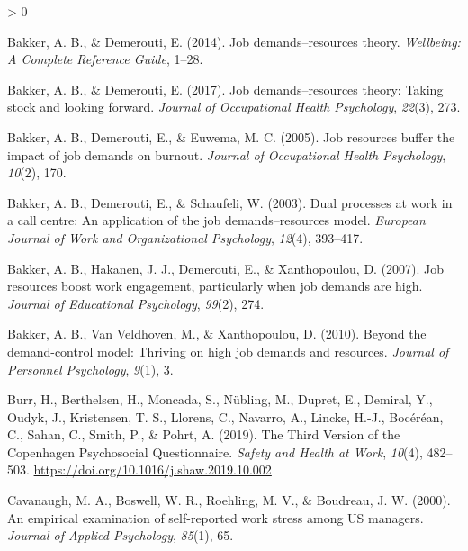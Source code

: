 \documentclass[
  english,
  man]{apa6}
\newlength{\cslhangindent}
\newenvironment{CSLReferences}[2] %
 {%
  \setlength{\parindent}{0pt}
  \ifodd #1 \everypar{\setlength{\hangindent}{\cslhangindent}}\ignorespaces\fi
  \ifnum #2 > 0
  \setlength{\parskip}{#2\baselineskip}
  \fi
 }%
 {}
\begin{document}
\begingroup
\setlength{\parindent}{-0.5in}
\setlength{\leftskip}{0.5in}

\hypertarget{refs}{}
\begin{CSLReferences}{1}{0}
\leavevmode\hypertarget{ref-bakker2014job}{}%
Bakker, A. B., \& Demerouti, E. (2014). Job demands--resources theory. \emph{Wellbeing: A Complete Reference Guide}, 1--28.

\leavevmode\hypertarget{ref-bakker2017job}{}%
Bakker, A. B., \& Demerouti, E. (2017). Job demands--resources theory: Taking stock and looking forward. \emph{Journal of Occupational Health Psychology}, \emph{22}(3), 273.

\leavevmode\hypertarget{ref-bakker2005job}{}%
Bakker, A. B., Demerouti, E., \& Euwema, M. C. (2005). Job resources buffer the impact of job demands on burnout. \emph{Journal of Occupational Health Psychology}, \emph{10}(2), 170.

\leavevmode\hypertarget{ref-bakker2003dual}{}%
Bakker, A. B., Demerouti, E., \& Schaufeli, W. (2003). Dual processes at work in a call centre: An application of the job demands--resources model. \emph{European Journal of Work and Organizational Psychology}, \emph{12}(4), 393--417.

\leavevmode\hypertarget{ref-bakker2007job}{}%
Bakker, A. B., Hakanen, J. J., Demerouti, E., \& Xanthopoulou, D. (2007). Job resources boost work engagement, particularly when job demands are high. \emph{Journal of Educational Psychology}, \emph{99}(2), 274.

\leavevmode\hypertarget{ref-bakker2010beyond}{}%
Bakker, A. B., Van Veldhoven, M., \& Xanthopoulou, D. (2010). Beyond the demand-control model: Thriving on high job demands and resources. \emph{Journal of Personnel Psychology}, \emph{9}(1), 3.

\leavevmode\hypertarget{ref-burr_third_2019}{}%
Burr, H., Berthelsen, H., Moncada, S., Nübling, M., Dupret, E., Demiral, Y., Oudyk, J., Kristensen, T. S., Llorens, C., Navarro, A., Lincke, H.-J., Bocéréan, C., Sahan, C., Smith, P., \& Pohrt, A. (2019). The {Third} {Version} of the {Copenhagen} {Psychosocial} {Questionnaire}. \emph{Safety and Health at Work}, \emph{10}(4), 482--503. \url{https://doi.org/10.1016/j.shaw.2019.10.002}

\leavevmode\hypertarget{ref-cavanaugh2000empirical}{}%
Cavanaugh, M. A., Boswell, W. R., Roehling, M. V., \& Boudreau, J. W. (2000). An empirical examination of self-reported work stress among US managers. \emph{Journal of Applied Psychology}, \emph{85}(1), 65.


\end{CSLReferences}
\end{document}
